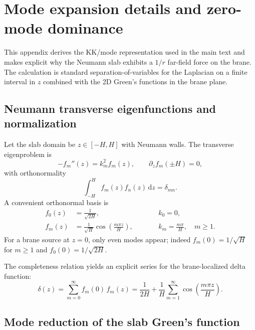 \documentclass[11pt]{article}
\newcommand{\dd}{\mathrm{d}}
\begin{document}
\section{Mode expansion details and zero-mode dominance}
\label{app:modes}

This appendix derives the KK/mode representation used in the main text and makes explicit why the
Neumann slab exhibits a $1/r$ far-field force on the brane.
The calculation is standard separation-of-variables for the Laplacian on a finite interval in $z$
combined with the 2D Green's functions in the brane plane.

\subsection{Neumann transverse eigenfunctions and normalization}

Let the slab domain be $z\in[-H,H]$ with Neumann walls.  The transverse eigenproblem is
\begin{equation}
  -f_m''(z)=k_m^2 f_m(z),\qquad \partial_z f_m(\pm H)=0,
\end{equation}
with orthonormality
\begin{equation}
  \int_{-H}^{H} f_m(z) f_n(z)\,\dd z = \delta_{mn}.
\end{equation}
A convenient orthonormal basis is
\begin{align}
  f_0(z) &= \frac{1}{\sqrt{2H}}, \qquad &&k_0=0,\\
  f_m(z) &= \frac{1}{\sqrt{H}}\cos\!\left(\frac{m\pi z}{H}\right), \qquad &&k_m=\frac{m\pi}{H},\quad m\ge 1.
\end{align}
For a brane source at $z=0$, only even modes appear; indeed $f_m(0)=1/\sqrt{H}$ for $m\ge 1$ and
$f_0(0)=1/\sqrt{2H}$.

The completeness relation yields an explicit series for the brane-localized delta function:
\begin{equation}
  \delta(z) = \sum_{m=0}^{\infty} f_m(0)\,f_m(z)
  = \frac{1}{2H} + \frac{1}{H}\sum_{m=1}^{\infty}\cos\!\left(\frac{m\pi z}{H}\right).
  \label{eq:app_delta_expansion}
\end{equation}

\subsection{Mode reduction of the slab Green's function}
\end{document}
